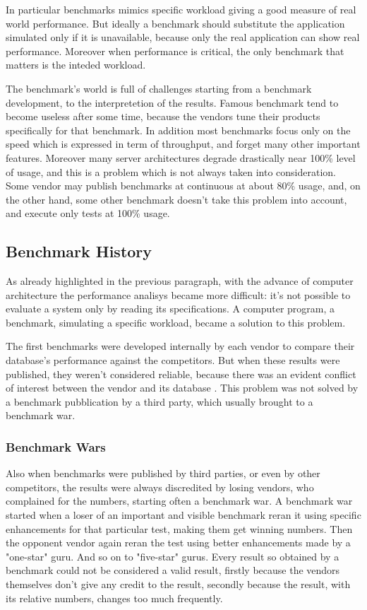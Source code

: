 In particular benchmarks mimics specific workload giving a good measure of real world performance. But ideally a benchmark should substitute the application simulated only if it is unavailable, because only the real application can show real performance. Moreover when performance is critical, the only benchmark that matters is the inteded workload.

The benchmark's world is full of challenges starting from a benchmark development, to the interpretetion of the results. Famous benchmark tend to become useless after some time, because the vendors tune their products specifically for that benchmark. In addition most benchmarks focus only on the speed which is expressed in term of throughput, and forget many other important features. Moreover many server architectures degrade drastically near 100\% level of usage, and this is a problem which is not always taken into consideration. Some vendor may publish benchmarks at continuous at about 80\% usage, and, on the other hand, some other benchmark doesn't take this problem into account, and execute only tests at 100\% usage.
		
		\subsection{Benchmark History} \label{bench-history}
As already highlighted in the previous paragraph, with the advance of computer architecture the performance analisys became more difficult: it's not possible to evaluate a system only by reading its specifications. A computer program, a benchmark, simulating a specific workload, became a solution to this problem.

The first benchmarks were developed internally by each vendor to compare their database's performance against the competitors. But when these results were published, they weren't considered reliable, because there was an evident conflict of interest between the vendor and its database \cite{gray}. This problem was not solved by a benchmark pubblication by a third party, which usually brought to a benchmark war.
	
		\subsubsection{Benchmark Wars}
Also when benchmarks were published by third parties, or even by other competitors, the results were always discredited by losing vendors, who complained for the numbers, starting often a benchmark war. A benchmark war started when a loser of an important and visible benchmark reran it using specific enhancements for that particular test, making them get winning numbers. Then the opponent vendor again reran the test using better enhancements made by a "one-star" guru. And so on to "five-star" gurus. Every result so obtained by a benchmark could not be considered a valid result, firstly because the vendors themselves don't give any credit to the result, secondly because the result, with its relative numbers, changes too much frequently. 

